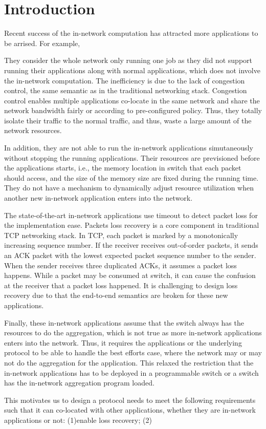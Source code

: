 \section{Introduction}
Recent success of the in-network computation has attracted more 
applications to be arrised. For example, 


They consider the whole network only running one job
as they did not support running their applications along with normal applications, 
which does not involve the in-network computation.
The inefficiency is due to the lack of congestion control, the same semantic 
as in the traditional networking stack.
Congestion control enables multiple applications co-locate in the same network and share the network
bandwidth fairly or according to pre-configured policy.
Thus, they totally isolate their traffic to the normal traffic, and thus, waste
a large amount of the network resources. 

In addition, they are not able to run the in-network applications simutaneously without stopping the running applications.
Their resources are previsioned before the applications starts, i.e., 
the memory location in switch that each packet should access, and the
size of the memory size are fixed during the running time.
They do not have a mechanism to dynamically adjust resource utilization 
when another new in-network application enters into the network.


The state-of-the-art in-network applications use timeout to detect packet loss for the implementation ease.  
Packets loss recovery is a core component in
traditional TCP networking stack.
In TCP, each packet is marked by a monotonically increasing sequence number. 
If the receiver receives out-of-order packets, it sends an ACK packet with the lowest 
expected packet sequence number to the sender. 
When the sender receives three duplicated ACKs, it assumes a packet loss happens.
While a packet may be consumed at switch, it can cause the confusion at the receiver
that a packet loss happened. It is challenging to design loss recovery due to that the end-to-end semantics are broken 
for these new applications.
 
Finally, these in-network applications assume that the switch always has the resources to do the aggregation,
which is not true as more in-network applications enters into the network. Thus, it requires the applications or
the underlying protocol to be able to handle the best efforts case, where the network may or may not do the 
aggregation for the application. This relaxed the restriction that the in-network applications has to be deployed 
in a programmable switch or a switch has the in-network aggregation program loaded.   

This motivates us to design a protocol needs to meet the following requirements such that it can co-located with other 
applications, whether they are in-network applications or not:
(1)enable loss recovery; (2)
